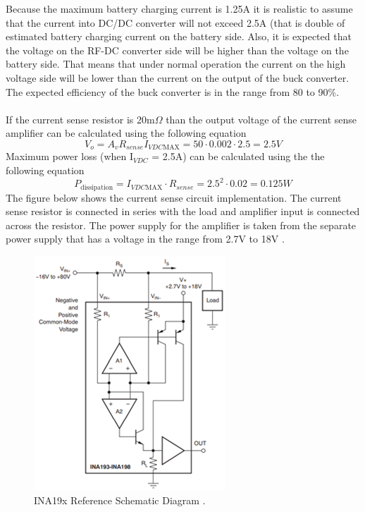 \documentclass[12pt]{article}
\begin{document}
\indent
Because the maximum battery charging current is 1.25A it is realistic to assume that the current into DC/DC converter will not exceed 2.5A (that is double of estimated battery charging current on the battery side. Also, it is expected that the voltage on the RF-DC converter side will be higher than the voltage on the battery side. That means that under normal operation the current on the high voltage side will be lower than the current on the output of the buck converter. The expected efficiency of the buck converter is in the range from 80 to 90\%.\\
\hfill \\
If the current sense resistor is 20m$\Omega$ than the output voltage of the current sense amplifier can be calculated using the following equation%
\begin{equation}
V_o = A_v R_{sense}I_{VDC\mathrm{MAX}} = 50 \cdot 0.002 \cdot 2.5 = 2.5V
\end{equation}
Maximum power loss (when I$_{VDC}$ = 2.5A) can be calculated using the the following equation 
\begin{equation}
P_{\mathrm{dissipation}} = I_{VDC\mathrm{MAX}} \cdot R_{sense} = 2.5^2 \cdot 0.02 = 0.125 W
\end{equation}
\indent
The figure below shows the current sense circuit implementation. The current sense resistor is connected in series with the load and amplifier input is connected across the resistor. The power supply for the amplifier is taken from the separate power supply that has a voltage in the range from 2.7V to 18V \cite{INA19x}.
\begin{figure}[h!]
\centering
\includegraphics[width=0.65\linewidth]{ina19x_ref}
\caption{INA19x Reference Schematic Diagram \cite{INA19x}.}
\end{figure}
\hfill\\
\pagebreak
\end{document}

